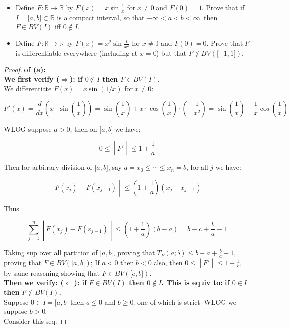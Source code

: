 \begin{itemize}
\item
  Define \(F:\mathbb{R}\rightarrow\mathbb{R}\) by \(F(x) = x\sin\frac{1}{x}\) for \(x \neq 0\) and \(F(0) = 1\). Prove that if \(I = \lbrack a,b\rbrack \subset \mathbb{R}\) is a compact interval, so that \(- \infty < a < b < \infty\), then \(F \in BV(I)\) iff \(0 \notin I\).
\item
  Define \(F:\mathbb{R}\rightarrow\mathbb{R}\) by \(F(x) = x^{2}\sin\frac{1}{x^{2}}\) for \(x \neq 0\) and \(F(0) = 0\). Prove that \(F\) is differentiable everywhere (including at \(x = 0\)) but that \(F \notin BV(\lbrack - 1,1\rbrack)\).
\end{itemize}

\begin{proof}

\textbf{of (a):}\\
\textbf{We first verify (\(\Longrightarrow\)): if \(0 \notin I\) then \(F \in BV(I)\).}\\
We differentiate \(F(x) = x\sin(1/x)\) for \(x \neq 0\):

\[F'(x) = \frac{d}{dx}\left( {x \cdot \sin\left( \frac{1}{x} \right)} \right) = \sin\left( \frac{1}{x} \right) + x \cdot \cos\left( \frac{1}{x} \right) \cdot \left( {- \frac{1}{x^{2}}} \right) = \sin\left( \frac{1}{x} \right) - \frac{1}{x}\cos\left( \frac{1}{x} \right)\]

WLOG suppose \(a > 0\), then on \(\lbrack a,b\rbrack\) we have:

\[\left. 0 \leq \middle| F' \middle| \leq 1 + \frac{1}{a} \right.\]

Then for arbitrary division of \(\lbrack a,b\rbrack\), say \(a = x_{0} \leq \cdots \leq x_{n} = b\), for all \(j\) we have:

\[\left. |F(x_{j}) - F(x_{j - 1}) \middle| \leq (1 + \frac{1}{a})(x_{j} - x_{j - 1}) \right.\]

Thus

\[\left. \sum\limits_{j = 1}^{n} \middle| F(x_{j}) - F(x_{j - 1}) \middle| \leq (1 + \frac{1}{a})(b - a) = b - a + \frac{b}{a} - 1 \right.\]

Taking sup over all partition of \(\lbrack a,b\rbrack\), proving that \(T_{F}(a;b) \leq b - a + \frac{b}{a} - 1\), proving that \(F \in BV(\lbrack a,b\rbrack)\); If \(a < 0\) then \(b < 0\) also, then \(\left. 0 \leq \middle| F' \middle| \leq 1 - \frac{1}{b} \right.\), by same reasoning showing that \(F \in BV(\lbrack a,b\rbrack)\).\\
\textbf{Then we verify: (\(\Longleftarrow\)): if \(F \in BV(I)\) then \(0 \notin I\). This is equiv to: if \(0 \in I\) then \(F \notin BV(I)\).}\\
Suppose \(0 \in I = \lbrack a,b\rbrack\) then \(a \leq 0\) and \(b \geq 0\), one of which is strict. WLOG we suppose \(b > 0\).\\
Consider this seq:


\end{proof}
